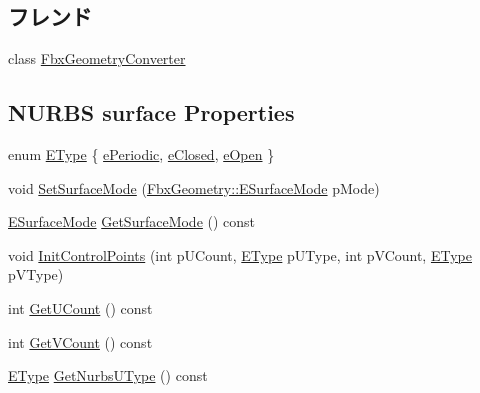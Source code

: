 \subsection*{フレンド}
\begin{DoxyCompactItemize}
\item 
class \hyperlink{class_fbx_nurbs_surface_a2c65afd59c2bab21d92824fbe4422545}{Fbx\+Geometry\+Converter}
\end{DoxyCompactItemize}
\subsection*{N\+U\+R\+BS surface Properties}
\begin{DoxyCompactItemize}
\item 
enum \hyperlink{class_fbx_nurbs_surface_a87c1fcd98d8fa511ee6c6166346a46b3}{E\+Type} \{ \hyperlink{class_fbx_nurbs_surface_a87c1fcd98d8fa511ee6c6166346a46b3a6c741d98410a44937740b7746172fa9d}{e\+Periodic}, 
\hyperlink{class_fbx_nurbs_surface_a87c1fcd98d8fa511ee6c6166346a46b3a8e9a7875582e62bbdbd88239914e8e4c}{e\+Closed}, 
\hyperlink{class_fbx_nurbs_surface_a87c1fcd98d8fa511ee6c6166346a46b3ad7359ceed25157534fff77a589649bd1}{e\+Open}
 \}
\item 
void \hyperlink{class_fbx_nurbs_surface_ae11f794bfd8288aa2f4b84b94beaddc1}{Set\+Surface\+Mode} (\hyperlink{class_fbx_geometry_adb9d2e34481a2cb40f1d783c665794db}{Fbx\+Geometry\+::\+E\+Surface\+Mode} p\+Mode)
\item 
\hyperlink{class_fbx_geometry_adb9d2e34481a2cb40f1d783c665794db}{E\+Surface\+Mode} \hyperlink{class_fbx_nurbs_surface_a00e68c448d8dc33a1f2a7f4d8996331e}{Get\+Surface\+Mode} () const
\item 
void \hyperlink{class_fbx_nurbs_surface_a1a069b51259bd4339bc7f9accf5937ff}{Init\+Control\+Points} (int p\+U\+Count, \hyperlink{class_fbx_nurbs_surface_a87c1fcd98d8fa511ee6c6166346a46b3}{E\+Type} p\+U\+Type, int p\+V\+Count, \hyperlink{class_fbx_nurbs_surface_a87c1fcd98d8fa511ee6c6166346a46b3}{E\+Type} p\+V\+Type)
\item 
int \hyperlink{class_fbx_nurbs_surface_aed399de214fdd1f387289428626df0da}{Get\+U\+Count} () const
\item 
int \hyperlink{class_fbx_nurbs_surface_a019ea2ce9a16d0f4a626209da05f52a3}{Get\+V\+Count} () const
\item 
\hyperlink{class_fbx_nurbs_surface_a87c1fcd98d8fa511ee6c6166346a46b3}{E\+Type} \hyperlink{class_fbx_nurbs_surface_a677c5bf162fa6186aaec305ff840c6e6}{Get\+Nurbs\+U\+Type} () const
\item 

\end{DoxyCompactItemize}
